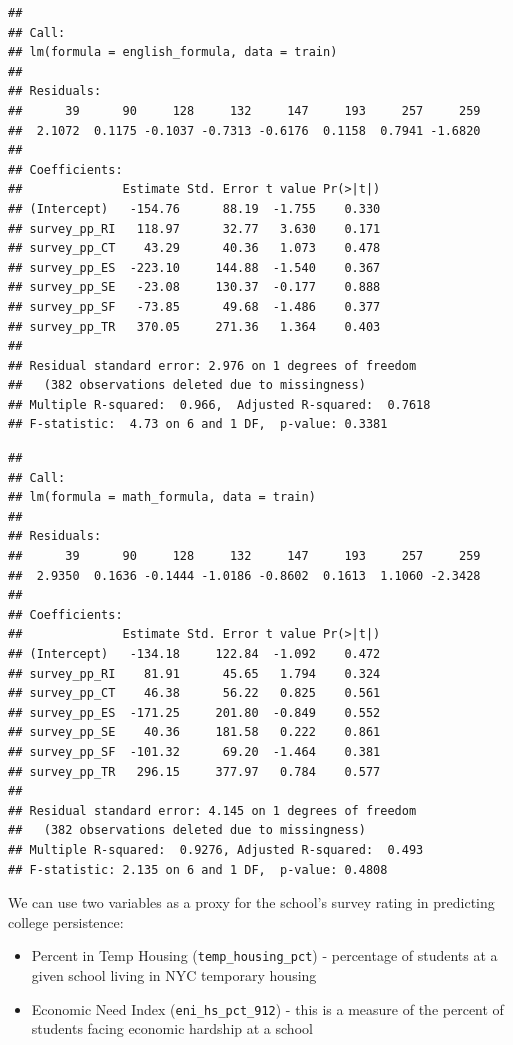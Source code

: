 \documentclass[
  man]{apa6}
\providecommand{\tightlist}{%
  \setlength{\itemsep}{0pt}\setlength{\parskip}{0pt}}
\begin{document}
\begin{verbatim}
## 
## Call:
## lm(formula = english_formula, data = train)
## 
## Residuals:
##      39      90     128     132     147     193     257     259 
##  2.1072  0.1175 -0.1037 -0.7313 -0.6176  0.1158  0.7941 -1.6820 
## 
## Coefficients:
##              Estimate Std. Error t value Pr(>|t|)
## (Intercept)   -154.76      88.19  -1.755    0.330
## survey_pp_RI   118.97      32.77   3.630    0.171
## survey_pp_CT    43.29      40.36   1.073    0.478
## survey_pp_ES  -223.10     144.88  -1.540    0.367
## survey_pp_SE   -23.08     130.37  -0.177    0.888
## survey_pp_SF   -73.85      49.68  -1.486    0.377
## survey_pp_TR   370.05     271.36   1.364    0.403
## 
## Residual standard error: 2.976 on 1 degrees of freedom
##   (382 observations deleted due to missingness)
## Multiple R-squared:  0.966,  Adjusted R-squared:  0.7618 
## F-statistic:  4.73 on 6 and 1 DF,  p-value: 0.3381
\end{verbatim}

\begin{verbatim}
## 
## Call:
## lm(formula = math_formula, data = train)
## 
## Residuals:
##      39      90     128     132     147     193     257     259 
##  2.9350  0.1636 -0.1444 -1.0186 -0.8602  0.1613  1.1060 -2.3428 
## 
## Coefficients:
##              Estimate Std. Error t value Pr(>|t|)
## (Intercept)   -134.18     122.84  -1.092    0.472
## survey_pp_RI    81.91      45.65   1.794    0.324
## survey_pp_CT    46.38      56.22   0.825    0.561
## survey_pp_ES  -171.25     201.80  -0.849    0.552
## survey_pp_SE    40.36     181.58   0.222    0.861
## survey_pp_SF  -101.32      69.20  -1.464    0.381
## survey_pp_TR   296.15     377.97   0.784    0.577
## 
## Residual standard error: 4.145 on 1 degrees of freedom
##   (382 observations deleted due to missingness)
## Multiple R-squared:  0.9276, Adjusted R-squared:  0.493 
## F-statistic: 2.135 on 6 and 1 DF,  p-value: 0.4808
\end{verbatim}

We can use two variables as a proxy for the school's survey rating in predicting college persistence:

\begin{itemize}
\tightlist
\item
  Percent in Temp Housing (\texttt{temp\_housing\_pct}) - percentage of students at a given school living in NYC temporary housing
\item
  Economic Need Index (\texttt{eni\_hs\_pct\_912}) - this is a measure of the percent of students facing economic hardship at a school
\end{itemize}
\end{document}
